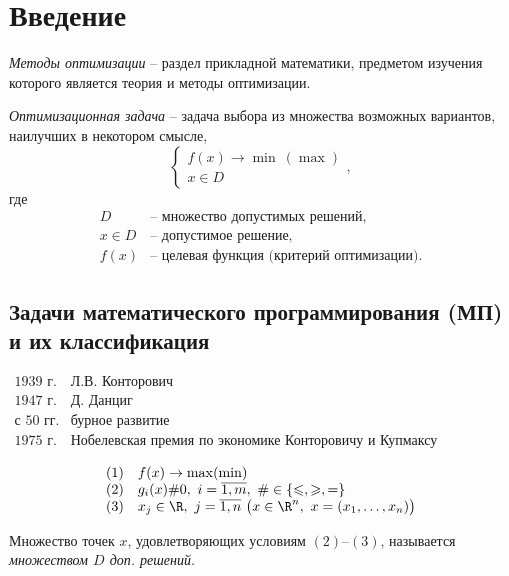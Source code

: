 \chapter*{Введение}


\emph{Методы оптимизации} -- раздел прикладной математики, предметом изучения которого является теория и методы оптимизации.

\begin{definition}
	\emph{Оптимизационная задача} -- задача выбора из множества возможных вариантов, наилучших в некотором смысле,
	\[
		\left\{\begin{array}{l}
			f(x) \rightarrow \min \ (\max) \\
			x \in D
		\end{array}\right.,
	\]
	где
	\[
		\begin{array}{rl}
			D       & \text{-- множество допустимых решений},           \\
			x \in D & \text{-- допустимое решение},                     \\
			f(x)    & \text{-- целевая функция (критерий оптимизации)}.
		\end{array}
	\]
\end{definition}

\section*{Задачи математического программирования (МП) и их классификация}

$\begin{array}{ll}
		\text{1939 г.}  & \text{Л.В. Конторович}                                        \\
		\text{1947 г.}  & \text{Д. Данциг}                                              \\
		\text{с 50 гг.} & \text{бурное развитие}                                        \\
		\text{1975 г.}  & \text{Нобелевская премия по экономике Конторовичу и Купмаксу}
	\end{array}$

\begin{definition}
	\[
		\begin{array}{ll}
			(1) & f(x) \rightarrow \max (\min)                                                     \\
			(2) & g_i(x) \# 0, \ i = \overline{1,m}, \ \# \in \{\leqslant ,\geqslant ,=\}          \\
			(3) & x_j \in \R, \ j = \overline{1,n} \ \big(x \in \R^n, \ x = (x_1,\ldots ,x_n)\big)
		\end{array}
	\]

	Множество точек $x$, удовлетворяющих условиям $(2)$--$(3)$, называется \emph{множеством $D$ доп. решений}.
\end{definition}

